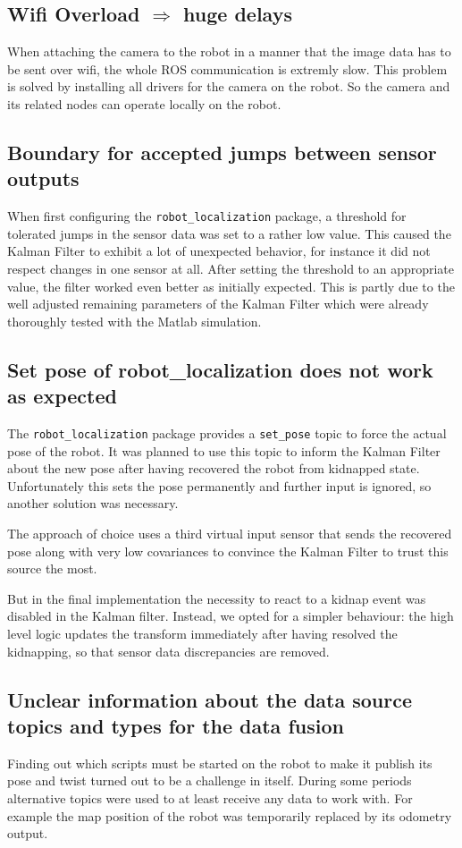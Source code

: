 \subsection{Wifi Overload $\Rightarrow$ huge delays}
When attaching the camera to the robot in a manner that the image data has to be sent over wifi, the whole ROS communication is extremly slow. This problem is solved by installing all drivers for the camera on the robot. So the camera and its related nodes can operate locally on the robot.

\subsection{Boundary for accepted jumps between sensor outputs}
When first configuring the \texttt{robot\_localization} package, a threshold for tolerated jumps in the sensor data was set to a rather low value. This caused the Kalman Filter to exhibit a lot of unexpected behavior, for instance it did not respect changes in one sensor at all. After setting the threshold to an appropriate value, the filter worked even better as initially expected. This is partly due to the well adjusted remaining parameters of the Kalman Filter which were already thoroughly tested with the Matlab simulation.

\subsection{Set pose of robot\_localization does not work as expected}
The \texttt{robot\_localization} package provides a \texttt{set\_pose} topic to force the actual pose of the robot. It was planned to use this topic to inform the Kalman Filter about the new pose after having recovered the robot from kidnapped state. Unfortunately this sets the pose permanently and further input is ignored, so another solution was necessary.

The approach of choice uses a third virtual input sensor that sends the recovered pose along with very low covariances to convince the Kalman Filter to trust this source the most.

But in the final implementation the necessity to react to a kidnap event was disabled in the Kalman filter. Instead, we opted for a simpler behaviour: the high level logic updates the transform immediately after having resolved the kidnapping, so that sensor data discrepancies are removed. 

\subsection{Unclear information about the data source topics and types for the data fusion}
Finding out which scripts must be started on the robot to make it publish its pose and twist turned out to be a challenge in itself. During some periods alternative topics were used to at least receive any data to work with. For example the map position of the robot was temporarily replaced by its odometry output.